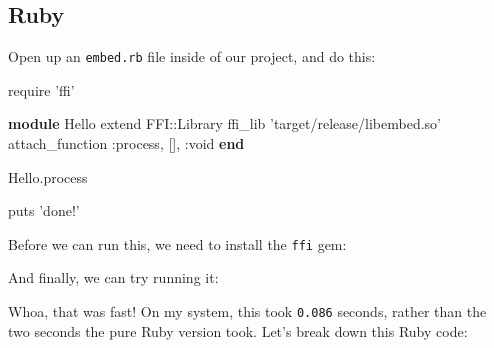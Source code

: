 \documentclass[a4paper,]{book}
\newenvironment{Shaded}{\begin{snugshade}}{\end{snugshade}}
\newcommand{\KeywordTok}[1]{\textcolor[rgb]{0.13,0.29,0.53}{\textbf{{#1}}}}
\newcommand{\DataTypeTok}[1]{\textcolor[rgb]{0.13,0.29,0.53}{{#1}}}
\newcommand{\StringTok}[1]{\textcolor[rgb]{0.31,0.60,0.02}{{#1}}}
\newcommand{\CommentTok}[1]{\textcolor[rgb]{0.56,0.35,0.01}{\textit{{#1}}}}
\newcommand{\NormalTok}[1]{{#1}}
\begin{document}
\subsection{Ruby}\label{ruby}

Open up an \texttt{embed.rb} file inside of our project, and do this:

\begin{Shaded}
\begin{Highlighting}[]
\NormalTok{require }\StringTok{'ffi'}

\KeywordTok{module} \DataTypeTok{Hello}
  \NormalTok{extend }\DataTypeTok{FFI}\NormalTok{::}\DataTypeTok{Library}
  \NormalTok{ffi_lib }\StringTok{'target/release/libembed.so'}
  \NormalTok{attach_function }\StringTok{:process}\NormalTok{, [], }\StringTok{:void}
\KeywordTok{end}

\DataTypeTok{Hello}\NormalTok{.process}

\NormalTok{puts }\StringTok{'done!'}
\end{Highlighting}
\end{Shaded}

Before we can run this, we need to install the \texttt{ffi} gem:

\begin{Shaded}
\end{Shaded}

And finally, we can try running it:

\begin{Shaded}
\end{Shaded}

Whoa, that was fast! On my system, this took \texttt{0.086} seconds,
rather than the two seconds the pure Ruby version took. Let's break down
this Ruby code:
\end{document}
